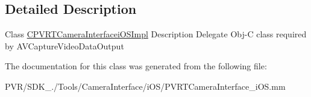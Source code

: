 \subsection{Detailed Description}


 Class \hyperlink{interface_c_p_v_r_t_camera_interfacei_o_s_impl}{C\+P\+V\+R\+T\+Camera\+Interfacei\+O\+S\+Impl} Description Delegate Obj-\/\+C class required by A\+V\+Capture\+Video\+Data\+Output 

The documentation for this class was generated from the following file\+:\begin{DoxyCompactItemize}
\item 
P\+V\+R/\+S\+D\+K\+\_./\+Tools/\+Camera\+Interface/i\+O\+S/P\+V\+R\+T\+Camera\+Interface\+\_\+i\+O\+S.\+mm\end{DoxyCompactItemize}
